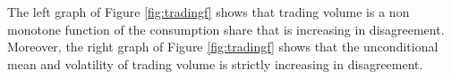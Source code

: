 The left graph of Figure \ref{fig:tradingf} shows that trading volume is a non monotone function of the consumption share that is increasing in disagreement. Moreover, the right graph of Figure \ref{fig:tradingf} shows that the unconditional mean and volatility of trading volume is strictly increasing in disagreement. 
